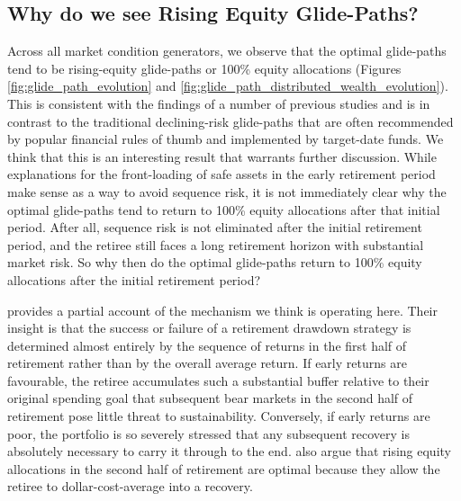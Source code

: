 \documentclass[11pt]{article}
\begin{document}
\subsection{Why do we see Rising Equity Glide-Paths?}

Across all market condition generators, we observe that the optimal glide-paths tend to be rising-equity glide-paths or 100\% equity allocations (Figures \ref{fig:glide_path_evolution} and \ref{fig:glide_path_distributed_wealth_evolution}). This is consistent with the findings of a number of previous studies \parencite[e.g.][]{anarkulova2025beyond, pfau2014rising} and is in contrast to the traditional declining-risk glide-paths that are often recommended by popular financial rules of thumb and implemented by target-date funds. We think that this is an interesting result that warrants further discussion. While explanations for the front-loading of safe assets in the early retirement period make sense as a way to avoid sequence risk, it is not immediately clear why the optimal glide-paths tend to return to 100\% equity allocations after that initial period. After all, sequence risk is not eliminated after the initial retirement period, and the retiree still faces a long retirement horizon with substantial market risk. So why then do the optimal glide-paths return to 100\% equity allocations after the initial retirement period? 

\textcite{pfau2014rising} provides a partial account of the mechanism we think is operating here. Their insight is that the success or failure of a retirement drawdown strategy is determined almost entirely by the sequence of returns in the first half of retirement rather than by the overall average return. If early returns are favourable, the retiree accumulates such a substantial buffer relative to their original spending goal that subsequent bear markets in the second half of retirement pose little threat to sustainability. Conversely, if early returns are poor, the portfolio is so severely stressed that any subsequent recovery is absolutely necessary to carry it through to the end. \textcite{pfau2014rising} also argue that rising equity allocations in the second half of retirement are optimal because they allow the retiree to dollar-cost-average into a recovery.
\end{document}
